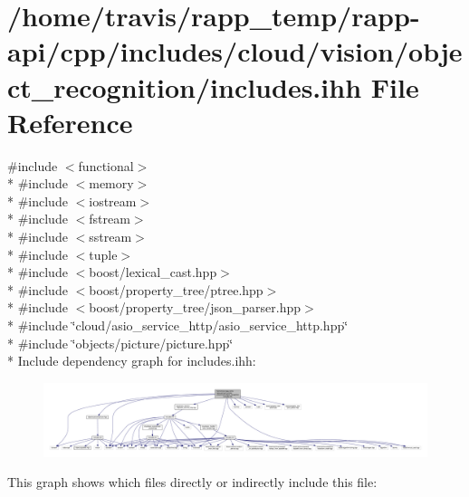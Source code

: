 \hypertarget{cloud_2vision_2object__recognition_2includes_8ihh}{\section{/home/travis/rapp\-\_\-temp/rapp-\/api/cpp/includes/cloud/vision/object\-\_\-recognition/includes.ihh File Reference}
\label{cloud_2vision_2object__recognition_2includes_8ihh}
}
{\ttfamily \#include $<$functional$>$}\\*
{\ttfamily \#include $<$memory$>$}\\*
{\ttfamily \#include $<$iostream$>$}\\*
{\ttfamily \#include $<$fstream$>$}\\*
{\ttfamily \#include $<$sstream$>$}\\*
{\ttfamily \#include $<$tuple$>$}\\*
{\ttfamily \#include $<$boost/lexical\-\_\-cast.\-hpp$>$}\\*
{\ttfamily \#include $<$boost/property\-\_\-tree/ptree.\-hpp$>$}\\*
{\ttfamily \#include $<$boost/property\-\_\-tree/json\-\_\-parser.\-hpp$>$}\\*
{\ttfamily \#include \char`\"{}cloud/asio\-\_\-service\-\_\-http/asio\-\_\-service\-\_\-http.\-hpp\char`\"{}}\\*
{\ttfamily \#include \char`\"{}objects/picture/picture.\-hpp\char`\"{}}\\*
Include dependency graph for includes.\-ihh\-:
\nopagebreak
\begin{figure}[H]
\begin{center}
\leavevmode
\includegraphics[width=350pt]{cloud_2vision_2object__recognition_2includes_8ihh__incl}
\end{center}
\end{figure}
This graph shows which files directly or indirectly include this file\-:
\nopagebreak

